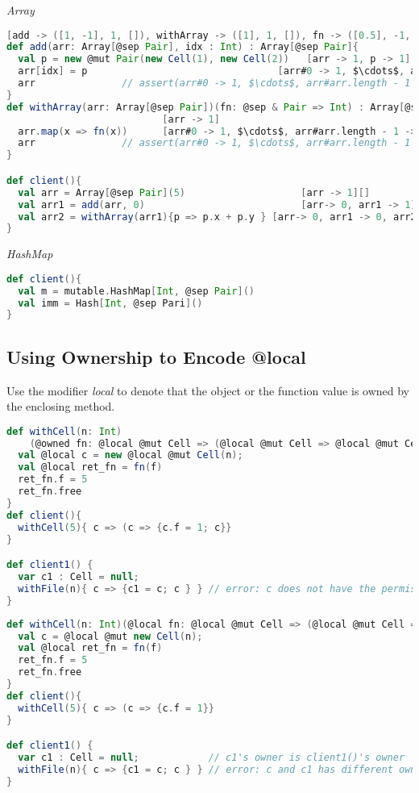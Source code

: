 \emph{Array}
\begin{lstlisting}[language=Scala,basicstyle=\footnotesize\ttfamily]
[add -> ([1, -1], 1, []), withArray -> ([1], 1, []), fn -> ([0.5], -1, [])]
def add(arr: Array[@sep Pair], idx : Int) : Array[@sep Pair]{
  val p = new @mut Pair(new Cell(1), new Cell(2))   [arr -> 1, p -> 1]
  arr[idx] = p                                 [arr#0 -> 1, $\cdots$, arr#arr.length - 1 -> 1] 
  arr               // assert(arr#0 -> 1, $\cdots$, arr#arr.length - 1 -> 1)
}
def withArray(arr: Array[@sep Pair])(fn: @sep & Pair => Int) : Array[@sep Pair]{
                           [arr -> 1]
  arr.map(x => fn(x))      [arr#0 -> 1, $\cdots$, arr#arr.length - 1 -> 1]          
  arr               // assert(arr#0 -> 1, $\cdots$, arr#arr.length - 1 -> 1)
}

def client(){
  val arr = Array[@sep Pair](5)                    [arr -> 1][]
  val arr1 = add(arr, 0)                           [arr-> 0, arr1 -> 1][]
  val arr2 = withArray(arr1){p => p.x + p.y } [arr-> 0, arr1 -> 0, arr2 -> 1][]
}
\end{lstlisting}

\emph{HashMap}
\begin{lstlisting}[language=Scala,basicstyle=\footnotesize\ttfamily]
def client(){
  val m = mutable.HashMap[Int, @sep Pair]()
  val imm = Hash[Int, @sep Pari]()
}
\end{lstlisting}

\clearpage

\subsection{Using Ownership to Encode @local}
Use the modifier \emph{local} to denote that the object or the function value is owned by the enclosing method.
\begin{lstlisting}[language=Scala,basicstyle=\footnotesize\ttfamily]
def withCell(n: Int)
    (@owned fn: @local @mut Cell => (@local @mut Cell => @local @mut Cell)): Unit = {
  val @local c = new @local @mut Cell(n);
  val @local ret_fn = fn(f)
  ret_fn.f = 5
  ret_fn.free 
}
def client(){
  withCell(5){ c => (c => {c.f = 1; c}}
}

def client1() {
  var c1 : Cell = null;
  withFile(n){ c => {c1 = c; c } } // error: c does not have the permission
}
\end{lstlisting}

\begin{lstlisting}[language=Scala,basicstyle=\footnotesize\ttfamily]
def withCell(n: Int)(@local fn: @local @mut Cell => (@local @mut Cell => Unit): Unit = {
  val c = @local @mut new Cell(n);
  val @local ret_fn = fn(f)
  ret_fn.f = 5
  ret_fn.free 
}
def client(){
  withCell(5){ c => (c => {c.f = 1}}
}

def client1() {              
  var c1 : Cell = null;            // c1's owner is client1()'s owner
  withFile(n){ c => {c1 = c; c } } // error: c and c1 has different owner
}
\end{lstlisting}

